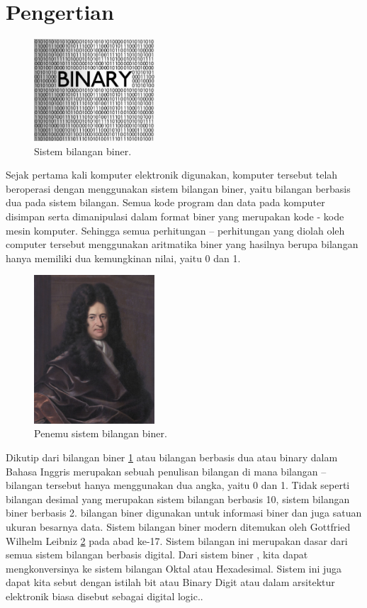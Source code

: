 \documentclass{article}
\begin{document}
\section{Pengertian} 

\begin{figure}[ht]
\centerline{\includegraphics[width=0.4\textwidth]{../figures/biner.jpg}}
\caption{Sistem bilangan biner.}
\label{biner}
\end{figure}

Sejak pertama kali komputer elektronik digunakan, komputer tersebut telah beroperasi dengan menggunakan sistem bilangan biner, yaitu bilangan berbasis dua pada sistem bilangan. Semua kode program dan data pada komputer disimpan serta dimanipulasi dalam format biner yang merupakan kode - kode mesin komputer. Sehingga semua perhitungan – perhitungan yang diolah oleh computer tersebut menggunakan aritmatika biner yang hasilnya berupa bilangan hanya memiliki dua kemungkinan nilai, yaitu 0 dan 1. 

\begin{figure}[ht]
\centerline{\includegraphics[width=0.4\textwidth]{../figures/gwl.jpg}}
\caption{Penemu sistem bilangan biner.}
\label{gwl}
\end{figure}

Dikutip dari \cite{hutahaean2015konsep} bilangan biner \ref{biner} atau bilangan berbasis dua atau binary dalam Bahasa Inggris merupakan sebuah penulisan bilangan di mana bilangan – bilangan tersebut hanya menggunakan dua angka, yaitu 0 dan 1. Tidak seperti bilangan desimal yang merupakan sistem bilangan berbasis 10, sistem bilangan biner berbasis 2. bilangan biner digunakan untuk informasi biner dan juga satuan ukuran besarnya data. Sistem bilangan biner modern ditemukan oleh Gottfried Wilhelm Leibniz \ref{gwl} pada abad ke-17. Sistem bilangan ini merupakan dasar dari semua sistem bilangan berbasis digital. Dari sistem biner , kita dapat mengkonversinya ke sistem bilangan Oktal atau Hexadesimal. Sistem ini juga dapat kita sebut dengan istilah bit atau Binary Digit atau dalam arsitektur elektronik biasa disebut sebagai digital logic.. 
\end{document}
